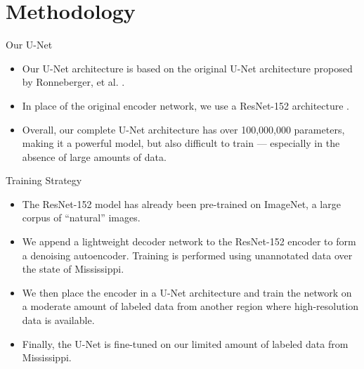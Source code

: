 \documentclass[aspectratio=169, hideallsubsectionså]{beamer}
\begin{document}
\section{Methodology}


\begin{frame}{Our U-Net}
    \begin{itemize}
        \item<1-> Our U-Net architecture is based on the original U-Net architecture proposed by Ronneberger, et al. \cite{ronnebergerUNetConvolutionalNetworks2015d}.
        \item<2-> In place of the original encoder network, we use a ResNet-152 architecture \cite{heDeepResidualLearning2015b}.
        \item<3-> Overall, our complete U-Net architecture has over 100,000,000 parameters, making it a powerful model, but also difficult to train --- especially in the absence of large amounts of data.
    \end{itemize}
\end{frame}

\begin{frame}{Training Strategy}
    \begin{itemize}
        \item<1-> The ResNet-152 model has already been pre-trained on ImageNet, a large corpus of ``natural'' images.
        \item<2-> We append a lightweight decoder network to the ResNet-152 encoder to form a denoising autoencoder. Training is performed using unannotated data over the state of Mississippi.
        \item<3-> We then place the encoder in a U-Net architecture and train the network on a moderate amount of labeled data from another region where high-resolution data is available.
        \item<4-> Finally, the U-Net is fine-tuned on our limited amount of labeled data from Mississippi.
    \end{itemize}
\end{frame}


\end{document}

